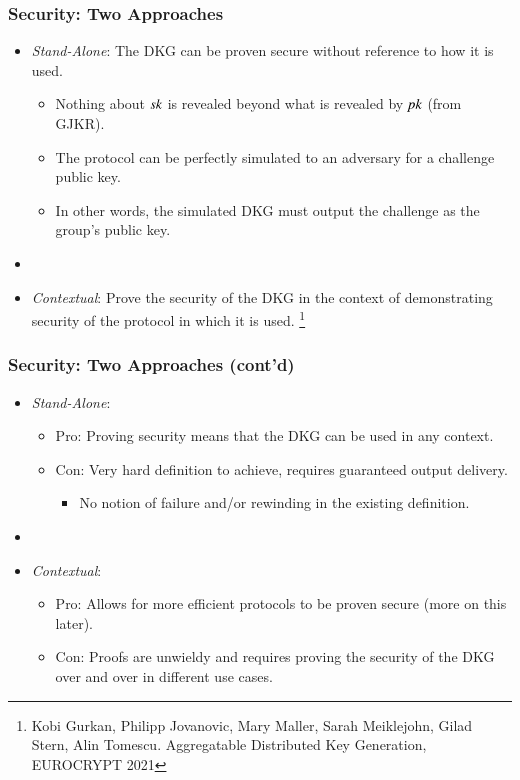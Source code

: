 \documentclass[hyperref={pdfpagelabels=true},table,dvipsnames,14pt,aspectratio=169]{beamer}
\begin{document}
\begin{frame}
  \frametitle{Security: Two Approaches}

  \begin{itemize}
    \item<1-> \emph{Stand-Alone}: The DKG can be proven secure without reference to how it is used.
    \begin{itemize}
      \item<2-> Nothing about $\mathit{sk}$ is revealed beyond what is revealed by $\mathit{pk}$ (from GJKR).
      \item<3-> The protocol can be perfectly simulated to an adversary for a challenge public key.
      \item<4-> In other words, the simulated DKG must output the challenge as the group's public key.
    \end{itemize}

    \item[]
    \item<5-> \emph{Contextual}: Prove the security of the DKG in the context of demonstrating security of the protocol in which it is used.
  \footnote{
  Kobi Gurkan, Philipp Jovanovic, Mary Maller, Sarah Meiklejohn, Gilad Stern, Alin Tomescu.
  Aggregatable Distributed Key Generation, EUROCRYPT 2021 }
  \end{itemize}
\end{frame}

\begin{frame}
  \frametitle{Security: Two Approaches (cont'd)}

  \begin{itemize}
    \item<1-> \emph{Stand-Alone}:
  \begin{itemize}
    \item<2-> Pro: Proving security means that the DKG can be used in any context.
    \item<3-> Con: Very hard definition to achieve, requires guaranteed output delivery.
  \begin{itemize}
    \item<4-> No notion of failure and/or rewinding in the existing definition.
    \end{itemize}
    \end{itemize}
    \item[]
    \item<5-> \emph{Contextual}:
  \begin{itemize}
    \item<6-> Pro: Allows for more efficient protocols to be proven secure (more on this later).
    \item<7-> Con: Proofs are unwieldy and requires proving the security of the DKG over and over in different use cases.
    \end{itemize}
  \end{itemize}
\end{frame}
\end{document}
